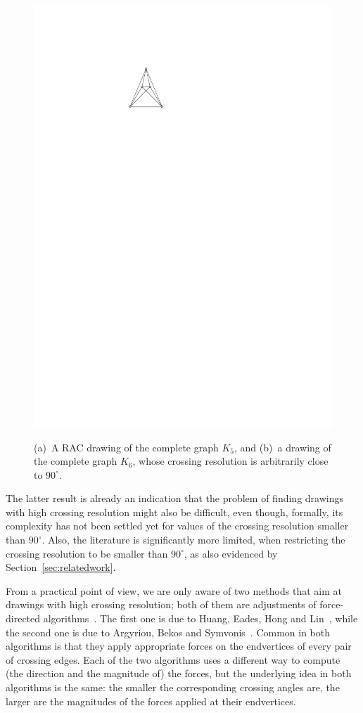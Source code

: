\documentclass[runningheads]{llncs}
\begin{document}
\begin{figure}[t!]
{	\includegraphics[page=2]{figures/examples}}
	\caption{%
	(a)~A RAC drawing of the complete graph $K_5$, and
	(b)~a drawing of the complete graph $K_6$, whose crossing resolution is arbitrarily close to $90^\circ$.}
	\label{fig:examples}
\end{figure} 

The latter result is already an indication that the problem of finding drawings with high crossing resolution might also be difficult, even though, formally, its complexity has not been settled yet for values of the crossing resolution smaller than $90^\circ$. Also, the literature is significantly more limited, when restricting the crossing resolution to be smaller than $90^\circ$, as also evidenced by Section~\ref{sec:relatedwork}. 

From a practical point of view, we are only aware of two methods that aim at drawings with high crossing resolution; both of them are adjustments of force-directed algorithms~\cite{DBLP:journals/congnum/Eades84}. The first one is due to Huang, Eades, Hong and Lin~\cite{DBLP:journals/vlc/HuangEHL13}, while the second one is due to Argyriou, Bekos and Symvonis~\cite{DBLP:journals/cj/ArgyriouBS13}. Common in both algorithms is that they apply appropriate forces on the endvertices of every pair of crossing edges. Each of the two algorithms uses a different way to compute (the direction and the magnitude of) the forces, but the underlying idea in both algorithms is the same: the smaller the corresponding crossing angles are, the larger are the magnitudes of the forces applied at their endvertices. 
\end{document}
